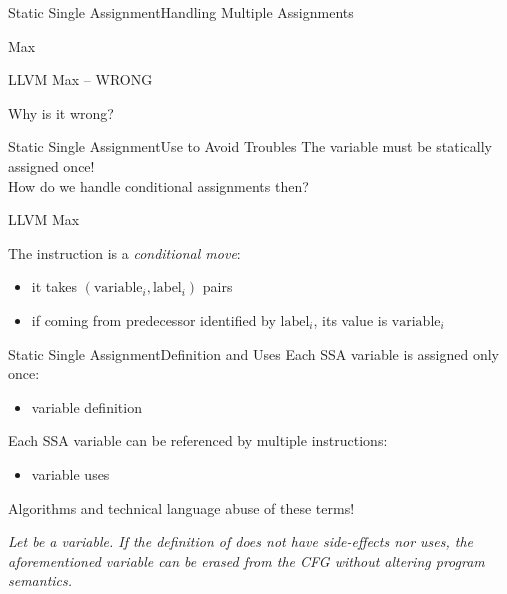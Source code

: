 \begin{frame}{Static Single Assignment}{Handling Multiple Assignments}
\begin{block}{Max}
\end{block}

\begin{block}{LLVM Max -- WRONG}
\end{block}

Why is it \alert{wrong}?
\end{frame}


\begin{frame}{Static Single Assignment}{Use  to Avoid Troubles}
The  variable must be statically assigned once!\\
How do we handle conditional assignments then?

\begin{block}{LLVM Max}
\end{block}

The  instruction is a \emph{conditional move}:

\begin{itemize}
\item it takes $(\textrm{variable}_i, \textrm{label}_i)$ pairs
\item if coming from predecessor identified by $\textrm{label}_i$, its value is $\textrm{variable}_i$
\end{itemize}
\end{frame}


\begin{frame}{Static Single Assignment}{Definition and Uses}
Each SSA variable is assigned only once:

\begin{itemize}
\item variable \alert{definition}
\end{itemize}

\vfill
Each SSA variable can be referenced by multiple instructions:

\begin{itemize}
\item variable \alert{uses}
\end{itemize}

\vfill
Algorithms and technical language abuse of these terms!

\vfill
\emph{
Let  be a variable. If the definition of  does not
have side-effects nor uses, the aforementioned  variable 
can be erased from the CFG without altering program semantics.
}
\end{frame}



